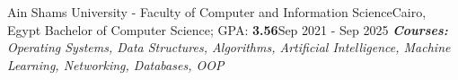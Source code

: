 
\resumeSubheading
{Ain Shams University - Faculty of Computer and Information Science}{Cairo, Egypt}
{Bachelor of Computer Science; GPA: \textbf{3.56}}{Sep 2021 - Sep 2025}
{\scriptsize \textit{ \footnotesize{\newline{}\textbf{
Courses:}  Operating Systems, Data Structures, Algorithms, Artificial Intelligence, Machine Learning, Networking, Databases, OOP}}}
